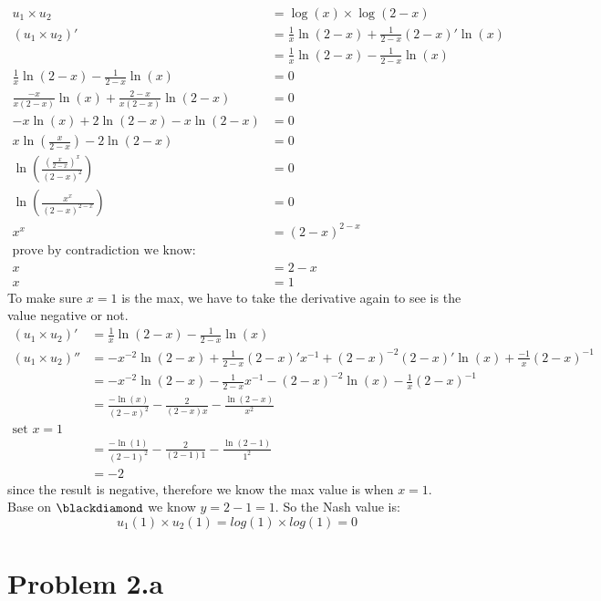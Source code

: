 \documentclass{article}
\begin{document}
\begin{align*}
u_1 \times u_2 &= \log(x) \times \log(2-x)\\
(u_1 \times u_2)' &= \frac{1}{x} \ln{(2-x)} + \frac{1}{2-x} (2-x)' \ln{(x)} \\
 &= \frac{1}{x} \ln{(2-x)} -\frac{1}{2-x}\ln{(x)} \\
 \frac{1}{x} \ln{(2-x)} -\frac{1}{2-x}\ln{(x)} &= 0\\
 \frac{-x}{x(2-x)}\ln(x) + \frac{2-x}{x(2-x)} \ln(2-x) &= 0\\
 -x\ln(x) + 2\ln(2-x) -x\ln(2-x)&= 0\\
 x\ln\left(\frac{x}{2-x}\right) - 2\ln(2-x) &= 0\\
 \ln\left(\frac{\left(\frac{x}{2-x}\right)^x}{(2-x)^2}\right) &= 0\\
\ln\left(\frac{x^x}{(2-x)^{2-x}}\right) &= 0\\
x^x &= (2-x)^{2-x}\\
\text{prove by contradiction we know: }\\
x &= 2-x\\
x &= 1
\end{align*}
To make sure $x = 1$ is the max, we have to take the derivative again to see is the value negative or not.
\begin{align*}
(u_1 \times u_2)' &= \frac{1}{x} \ln{(2-x)} -\frac{1}{2-x}\ln{(x)}\\
(u_1 \times u_2)'' &= -x^{-2}\ln(2-x) + \frac{1}{2-x}(2-x)'x^{-1} + (2-x)^{-2}(2-x)'\ln(x) + \frac{-1}{x}(2-x)^{-1}\\
&= -x^{-2}\ln(2-x) - \frac{1}{2-x}x^{-1}-(2-x)^{-2}\ln(x)-\frac{1}{x}(2-x)^{-1}\\
&= \frac{-\ln(x)}{(2-x)^2} - \frac{2}{(2-x)x} - \frac{\ln(2-x)}{x^2}\\
\text{set $x = 1$}\\
&= \frac{-\ln(1)}{(2-1)^2} - \frac{2}{(2-1)1} - \frac{\ln(2-1)}{1^2}\\
&= -2
\end{align*}
since the result is negative, therefore we know the max value is when $x = 1$.\\
Base on $\blackdiamond$ we know $y = 2-1 = 1$. So the Nash value is:
$$u_1(1) \times u_2(1) = log(1) \times log(1) = 0$$
\newpage
\section{Problem 2.a}
\end{document}
